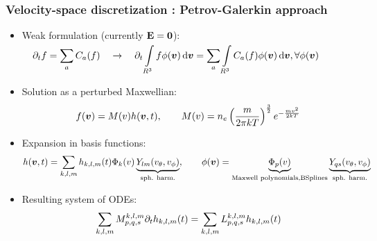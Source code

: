 \documentclass[mathserif, aspectratio=169]{beamer}
\newcommand{\ud}{\,\mathrm{d}}
\newcommand{\vect}[1]{\boldsymbol{#1}}
\newcommand{\of}[1]{\mleft( #1 \mright)}
\newcommand{\vth}{v_{\textrm{th}}}
\newcommand{\myint}[2]{\int\limits_{#1}^{#2}}
\begin{document}
	\begin{frame}
		\frametitle{Velocity-space discretization : Petrov-Galerkin approach}
		\begin{itemize}

		\item Weak formulation (currently $\bf E=0$):
		$
		\displaystyle
		\quad
		\partial_t f = \sum_{a} C_a(f)
		\quad \rightarrow \quad
		\partial_t \myint{R^3}{} f \phi\of{\vect{v}} \ud \vect{v} = \sum_{a}
		\myint{R^3}{} C_a(f) \phi\of{\vect{v}} \ud \vect{v}, \forall\phi(\vect{v})
		$

		\item Solution as a perturbed Maxwellian:
		\begin{align*}
		f\of{\vect{v}} = M\of{v} h\of{\vect{v},t}
		, \quad\quad
		M\of{v} = n_e \left( \frac{m}{2 \pi kT }\right)^{\frac32} e^{-\frac{mv^2}{2kT}}
		\end{align*}

		\item Expansion in basis functions:
		\begin{align*}
		h\of{\vect{v},t} =
		\sum_{k,l,m} h_{k,l,m} \of{t} \Phi_k\of{v} \underbrace{Y_{lm}\of{v_\theta, v_\phi}}_{\tiny\text{sph. harm.}},
		\quad
		\quad
		\phi\of{\vect{v}} = \underbrace{\Phi_p\of{v}}_{\tiny\text{Maxwell polynomials,BSplines}} \underbrace{Y_{qs}\of{v_\theta, v_\phi}}_{\tiny\text{sph. harm.}}
		\end{align*}

		\item Resulting system of ODEs:
		\begin{align*}
		\sum_{k,l,m} M_{p,q,s}^{k,l,m} \partial_t h_{k,l,m}\of{t} = \sum_{k,l,m}  L_{p,q,s}^{k,l,m} h_{k,l,m}\of{t}
		\end{align*}
		\end{itemize}
	\end{frame}
\end{document}
